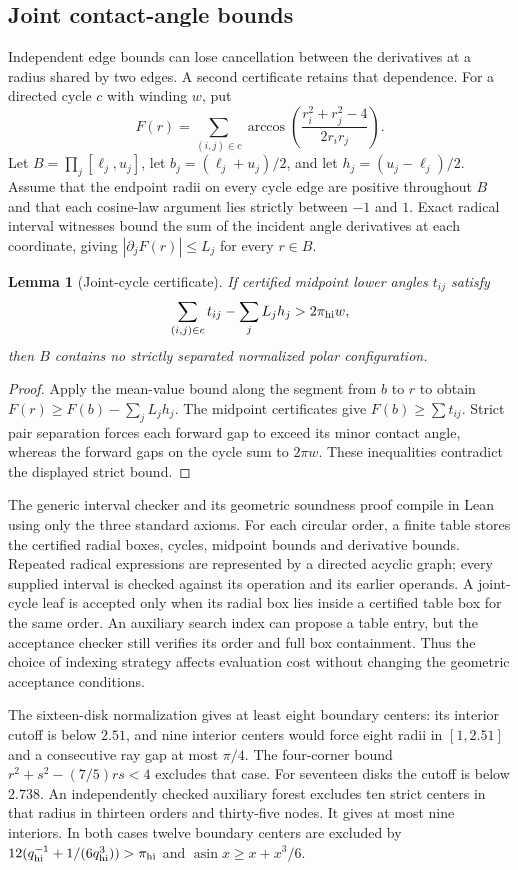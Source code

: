 \documentclass[11pt]{amsart}
\newtheorem{lemma}[theorem]{Lemma}
\theoremstyle{definition}
\theoremstyle{remark}
\DeclareMathOperator{\asin}{asin}
\begin{document}
\subsection{Joint contact-angle bounds}
Independent edge bounds can lose cancellation between the derivatives at
a radius shared by two edges. A second certificate retains that dependence.
For a directed cycle $c$ with winding $w$, put
\[
 F(r)=\sum_{(i,j)\in c}
 \arccos\!\left(\frac{r_i^2+r_j^2-4}{2r_ir_j}\right).
\]
Let $B=\prod_j[\ell_j,u_j]$, let $b_j=(\ell_j+u_j)/2$, and let
$h_j=(u_j-\ell_j)/2$. Assume that the endpoint radii on every cycle edge
are positive throughout $B$ and that each cosine-law argument lies strictly
between $-1$ and $1$. Exact radical interval witnesses bound the sum of
the incident angle derivatives at each coordinate, giving
$|\partial_j F(r)|\le L_j$ for every $r\in B$.
\begin{lemma}[Joint-cycle certificate]
If certified midpoint lower angles $t_{ij}$ satisfy
\[
 \sum_{(i,j)\in c}t_{ij}-\sum_j L_jh_j>2\pi_{\rm hi}w,
\]
then $B$ contains no strictly separated normalized polar configuration.
\end{lemma}
\begin{proof}
Apply the mean-value bound along the segment from $b$ to $r$ to obtain
$F(r)\ge F(b)-\sum_jL_jh_j$.
The midpoint certificates give $F(b)\ge\sum t_{ij}$.
Strict pair separation forces each forward gap to exceed its minor
contact angle, whereas the forward gaps on the cycle sum to $2\pi w$.
These inequalities contradict the displayed strict bound.
\end{proof}
The generic interval checker and its geometric soundness proof compile in
Lean using only the three standard axioms. For each circular order, a finite
table stores the certified radial boxes, cycles, midpoint bounds and
derivative bounds. Repeated radical expressions are represented by a
directed acyclic graph; every supplied interval is checked against its
operation and its earlier operands. A joint-cycle leaf is accepted only
when its radial box lies inside a certified table box for the same order.
An auxiliary search index can propose a table entry, but the acceptance
checker still verifies its order and full box containment. Thus the choice
of indexing strategy affects evaluation cost without changing the
geometric acceptance conditions.

The sixteen-disk normalization gives at least eight boundary centers: its
interior cutoff is below $2.51$, and nine interior centers would force eight
radii in $[1,2.51]$ and a consecutive ray gap at most $\pi/4$. The four-corner
bound $r^2+s^2-(7/5)rs<4$ excludes that case.
For seventeen disks the cutoff is below $2.738$. An independently checked
auxiliary forest excludes ten strict centers in that radius in thirteen
orders and thirty-five nodes. It gives at most nine interiors.
In both cases twelve boundary centers are excluded by
$12(q_{\rm hi}^{-1}+1/(6q_{\rm hi}^3))>\pi_{\rm hi}$ and
$\asin x\ge x+x^3/6$.
\end{document}
